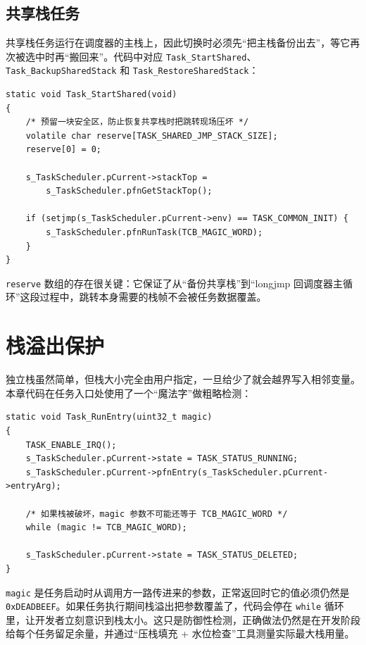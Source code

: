 \subsection{共享栈任务}

共享栈任务运行在调度器的主栈上，因此切换时必须先“把主栈备份出去”，等它再次被选中时再“搬回来”。代码中对应 \texttt{Task\_StartShared}、\texttt{Task\_BackupSharedStack} 和 \texttt{Task\_RestoreSharedStack}：

\begin{lstlisting}[style=c]
static void Task_StartShared(void)
{
    /* 预留一块安全区，防止恢复共享栈时把跳转现场压坏 */
    volatile char reserve[TASK_SHARED_JMP_STACK_SIZE];
    reserve[0] = 0;

    s_TaskScheduler.pCurrent->stackTop =
        s_TaskScheduler.pfnGetStackTop();

    if (setjmp(s_TaskScheduler.pCurrent->env) == TASK_COMMON_INIT) {
        s_TaskScheduler.pfnRunTask(TCB_MAGIC_WORD);
    }
}
\end{lstlisting}

\texttt{reserve} 数组的存在很关键：它保证了从“备份共享栈”到“longjmp 回调度器主循环”这段过程中，跳转本身需要的栈帧不会被任务数据覆盖。

\section{栈溢出保护}

独立栈虽然简单，但栈大小完全由用户指定，一旦给少了就会越界写入相邻变量。本章代码在任务入口处使用了一个“魔法字”做粗略检测：

\begin{lstlisting}[style=c]
static void Task_RunEntry(uint32_t magic)
{
    TASK_ENABLE_IRQ();
    s_TaskScheduler.pCurrent->state = TASK_STATUS_RUNNING;
    s_TaskScheduler.pCurrent->pfnEntry(s_TaskScheduler.pCurrent->entryArg);

    /* 如果栈被破坏，magic 参数不可能还等于 TCB_MAGIC_WORD */
    while (magic != TCB_MAGIC_WORD);

    s_TaskScheduler.pCurrent->state = TASK_STATUS_DELETED;
}
\end{lstlisting}

\texttt{magic} 是任务启动时从调用方一路传进来的参数，正常返回时它的值必须仍然是 \texttt{0xDEADBEEF}。如果任务执行期间栈溢出把参数覆盖了，代码会停在 \texttt{while} 循环里，让开发者立刻意识到栈太小。这只是防御性检测，正确做法仍然是在开发阶段给每个任务留足余量，并通过“压栈填充 + 水位检查”工具测量实际最大栈用量。

